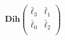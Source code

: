 \documentclass[preview]{standalone}
\begin{document}
\begin{align*}
\mathbf{Dih}\begin{pmatrix}    \bar{\ell}_3 & \bar{\ell}_1\\    \bar{\ell}_0 & \bar{\ell}_2\\\end{pmatrix}
\end{align*}
\end{document}
